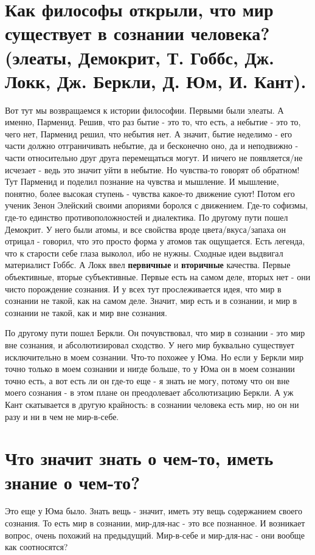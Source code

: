\section{ Как философы открыли, что мир существует в сознании человека? (элеаты, Демокрит, Т. Гоббс, Дж. Локк, Дж. Беркли, Д. Юм, И. Кант).}
Вот тут мы возвращаемся к истории философии. Первыми были элеаты. А именно, Парменид. Решив, что раз бытие - это то, что есть, а небытие - это то, чего нет, Парменид решил, что небытия нет. А значит, бытие неделимо - его части должно отграничивать небытие, да и бесконечно оно, да и неподвижно - части относительно друг друга перемещаться могут. И ничего не появляется/не исчезает - ведь это значит уйти в небытие. Но чувства-то говорят об обратном! Тут Парменид и поделил познание на чувства и мышление. И мышление, понятно, более высокая ступень - чувства какое-то движение суют! Потом его ученик Зенон Элейский своими апориями боролся с движением. Где-то софизмы, где-то единство противоположностей и диалектика. По другому пути пошел Демокрит. У него были атомы, и все свойства вроде цвета/вкуса/запаха он отрицал - говорил, что это просто форма у атомов так ощущается. Есть легенда, что к старости себе глаза выколол, ибо не нужны. Сходные идеи выдвигал материалист Гоббс. А Локк ввел \textbf{первичные} и \textbf{вторичные} качества. Первые объективные, вторые субъективные. Первые есть на самом деле, вторых нет - они чисто порождение сознания. И у всех тут прослеживается идея, что мир в сознании не такой, как на самом деле. Значит, мир есть и в сознании, и мир в сознании не такой, как и мир вне сознания. 

По другому пути пошел Беркли. Он почувствовал, что мир в сознании - это мир вне сознания, и абсолютизировал сходство. У него мир буквально существует исключительно в моем сознании. Что-то похожее у Юма. Но если у Беркли мир точно только в моем сознании и нигде больше, то у Юма он в моем сознании точно есть, а вот есть ли он где-то еще - я знать не могу, потому что он вне моего сознания - в этом плане он преодолевает абсолютизацию Беркли. А уж Кант скатывается в другую крайность: в сознании человека есть мир, но он ни разу и ни в чем не мир-в-себе.

\section{ Что значит знать о чем-то, иметь знание о чем-то?}
Это еще у Юма было. Знать вещь - значит, иметь эту вещь содержанием своего сознания. То есть мир в сознании, мир-для-нас - это все познанное. И возникает вопрос, очень похожий на предыдущий. Мир-в-себе и мир-для-нас - они вообще как соотносятся?

